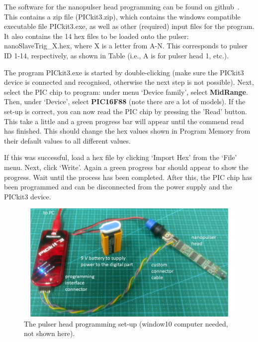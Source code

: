 The software for the nanopulser head programming can be found on github~\cite{GITHUB_PIC}. This contains a zip file (PICkit3.zip), which contains the windows compatible executable file PICkit3.exe, as well as other (required) input files for the program. It also contains the 14 hex files to be loaded onto the pulser: nanoSlaveTrig\_X.hex, where X is a letter from A-N. This corresponds to pulser ID 1-14, respectively, as shown in Table%
 (i.e., A is for pulser head 1, etc.).

The program PICkit3.exe is started by double-clicking (make sure the PICkit3 device is connected and recognised, otherwise the next step is not possible). Next, select the PIC chip to program: under menu `Device family', select {\bf MidRange}. Then, under `Device', select {\bf PIC16F88} (note there are a lot of models). If the set-up is correct, you can now read the PIC chip by pressing the 'Read' button. This take a little and a green progress bar will appear until the commend read has finished. This should change the hex values shown in Program Memory from their default values to all different values. 

If this was successful, load a hex file by clicking `Import Hex' from the `File' menu. Next, click `Write'. Again a green progress bar should appear to show the progress. Wait until the process has been completed. After this, the PIC chip has been programmed and can be disconnected from the power supply and the PICkit3 device.


\begin{figure}
\begin{center}	
  \includegraphics[width=1.0\linewidth]{figures/pulserhead_programming.jpg}
  \caption{The pulser head programming set-up (window10 computer needed, not shown here).}
  \label{figure:pulserhead_programming}
\end{center}
\end{figure}

